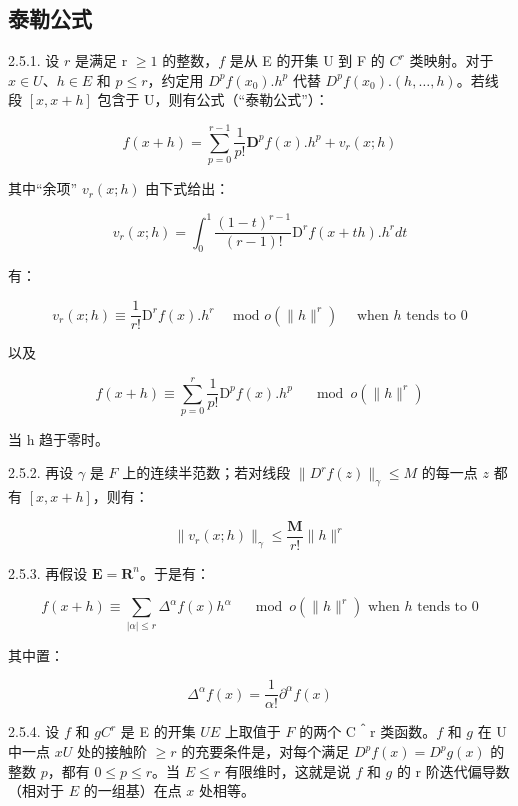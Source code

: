\subsection{泰勒公式}

2.5.1. 设 \(r\) 是满足 r \(\geqslant 1\) 的整数，\(f\) 是从 E 的开集 U 到 F 的 \(C^r\) 类映射。对于 \(x \in U\)、\(h \in E\) 和 \(p \leqslant r\)，约定用 \(D^{p}f(x_0).h^p\) 代替 \(D^{p}f(x_0).(h,\ldots,h)\)。若线段 \([x,x + h]\) 包含于 U，则有公式（“泰勒公式”）：

\[
f (x + h) = \sum_ {p = 0} ^ {r - 1} \frac {1}{p !} \mathbf {D} ^ {p} f (x). h ^ {p} + v _ {r} (x; h)
\]

其中“余项” \(v_{r}(x; h)\) 由下式给出：

\[
v _ {r} (x; h) = \int_ {0} ^ {1} \frac {(1 - t) ^ {r - 1}}{(r - 1) !} \mathrm{D} ^ {r} f (x + t h). h ^ {r} d t
\]

有：

\[
v _ {r} (x; h) \equiv \frac {1}{r !} \mathrm{D} ^ {r} f (x). h ^ {r} \quad \text {   mod   } o (\| h \| ^ {r}) \quad \text {   when   } h \text {   tends   to   } 0
\]

以及

\[
f (x + h) \equiv \sum_ {p = 0} ^ {r} \frac {1}{p !} \mathrm{D} ^ {p} f (x). h ^ {p} \quad \mod o (\| h \| ^ {r})
\]

当 h 趋于零时。

2.5.2. 再设 \(\gamma\) 是 \(F\) 上的连续半范数；若对线段 \(\|D^{r}f(z)\|_{\gamma}\leqslant M\) 的每一点 \(z\) 都有 \([x,x + h]\)，则有：

\[
\| v _ {r} (x; h) \| _ {\gamma} \leqslant \frac {\mathbf {M}}{r !} \| h \| ^ {r}
\]

2.5.3. 再假设 \(\mathbf{E} = \mathbf{R}^n\)。于是有：

\[
f (x + h) \equiv \sum_ {| \alpha | \leqslant r} \Delta^ {\alpha} f (x) h ^ {\alpha} \quad \mod o (\| h \| ^ {r}) \text {   when   } h \text {   tends   to   } 0
\]

其中置：

\[
\Delta^ {\alpha} f (x) = \frac {1}{\alpha !} \partial^ {\alpha} f (x)
\]

2.5.4. 设 \(f\) 和 \(g\)\(C^r\) 是 E 的开集 \(U\)\(E\) 上取值于 \(F\) 的两个 C＾r 类函数。\(f\) 和 \(g\) 在 U 中一点 \(x\)\(U\) 处的接触阶 \(\geqslant r\) 的充要条件是，对每个满足 \(D^p f(x) = D^p g(x)\) 的整数 \(p\)，都有 \(0 \leqslant p \leqslant r\)。当 \(E\)\(\leqslant r\) 有限维时，这就是说 \(f\) 和 \(g\) 的  r 阶迭代偏导数（相对于 \(E\) 的一组基）在点 \(x\) 处相等。

